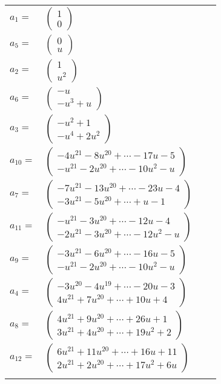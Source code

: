 \documentclass[1p]{elsarticle_modified}
\theoremstyle{definition}
\begin{document}
\begin{tabular}{m{7pt} m{180pt} m{7pt} m{180pt} }
\flushright $a_{1}=$&$\begin{pmatrix}1\\0\end{pmatrix}$ \\
\flushright $a_{5}=$&$\begin{pmatrix}0\\u\end{pmatrix}$ \\
\flushright $a_{2}=$&$\begin{pmatrix}1\\u^2\end{pmatrix}$ \\
\flushright $a_{6}=$&$\begin{pmatrix}- u\\- u^3+u\end{pmatrix}$ \\
\flushright $a_{3}=$&$\begin{pmatrix}- u^2+1\\- u^4+2 u^2\end{pmatrix}$ \\
\flushright $a_{10}=$&$\begin{pmatrix}-4 u^{21}-8 u^{20}+\cdots-17 u-5\\- u^{21}-2 u^{20}+\cdots-10 u^2- u\end{pmatrix}$ \\
\flushright $a_{7}=$&$\begin{pmatrix}-7 u^{21}-13 u^{20}+\cdots-23 u-4\\-3 u^{21}-5 u^{20}+\cdots+u-1\end{pmatrix}$ \\
\flushright $a_{11}=$&$\begin{pmatrix}- u^{21}-3 u^{20}+\cdots-12 u-4\\-2 u^{21}-3 u^{20}+\cdots-12 u^2- u\end{pmatrix}$ \\
\flushright $a_{9}=$&$\begin{pmatrix}-3 u^{21}-6 u^{20}+\cdots-16 u-5\\- u^{21}-2 u^{20}+\cdots-10 u^2- u\end{pmatrix}$ \\
\flushright $a_{4}=$&$\begin{pmatrix}-3 u^{20}-4 u^{19}+\cdots-20 u-3\\4 u^{21}+7 u^{20}+\cdots+10 u+4\end{pmatrix}$ \\
\flushright $a_{8}=$&$\begin{pmatrix}4 u^{21}+9 u^{20}+\cdots+26 u+1\\3 u^{21}+4 u^{20}+\cdots+19 u^2+2\end{pmatrix}$ \\
\flushright $a_{12}=$&$\begin{pmatrix}6 u^{21}+11 u^{20}+\cdots+16 u+11\\2 u^{21}+2 u^{20}+\cdots+17 u^2+6 u\end{pmatrix}$\\&\end{tabular}
\end{document}
